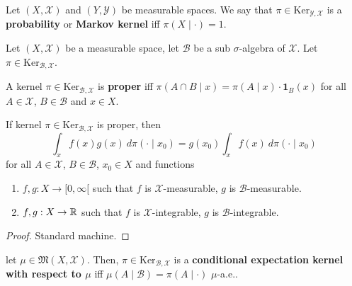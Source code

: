 \begin{definition}
    \label{def:markov-ker}
    \leanok

    Let $(X,\mathcal{X})$ and $(Y,\mathcal{Y})$ be measurable spaces. We say that $\pi\in\text{Ker}_{\mathcal{Y},\mathcal{X}}$ is a \textbf{probability} or \textbf{Markov kernel} iff $\pi(X\mid \cdot)=1$.
\end{definition}

Let $(X, \mathcal X)$ be a measurable space, let $\mathcal B$ be a sub $\sigma$-algebra of $\mathcal X$. Let $\pi \in \text{Ker}_{\mathcal B, \mathcal X}$.

\begin{definition}
    \label{def:proper-kernel}
    \leanok

    A kernel $\pi\in\text{Ker}_{\mathcal{B},\mathcal{X}}$ is \textbf{proper} iff $\pi(A\cap B\mid x)=\pi(A\mid x)\cdot\mathbf{1}_B(x)$ for all $A\in\mathcal{X}$, $B\in\mathcal{B}$ and $x\in X$.
\end{definition}

\begin{lemma}
    \label{lem:proper-kernel-integral}
    \leanok

    If kernel $\pi\in\text{Ker}_{\mathcal{B},\mathcal{X}}$ is proper, then
    $$\int_x f(x) g(x)\ d\pi(\cdot\mid x_0) = g(x_0)\int_x f(x)\ d\pi(\cdot\mid x_0)$$
    for all $A \in \mathcal X$, $B \in \mathcal B$, $x_0 \in X$ and functions
    \begin{enumerate}
        \item $f, g : X \to [0, \infty[$ such that $f$ is $\mathcal X$-measurable, $g$ is $\mathcal B$-measurable.
        \item $f, g : X \to \mathbb R$ such that $f$ is $\mathcal X$-integrable, $g$ is $\mathcal B$-integrable.
    \end{enumerate}
\end{lemma}
\begin{proof}

    Standard machine.
\end{proof}

\begin{definition}
    \label{def:cond-exp-ker}
    \leanok

    let $\mu\in\mathfrak{M}(X,\mathcal{X})$. Then, $\pi\in\text{Ker}_{\mathcal{B},\mathcal{X}}$ is a \textbf{conditional expectation kernel with respect to $\mu$} iff $\mu(A\mid \mathcal{B})=\pi(A\mid\cdot)$ $\mu$-a.e..
\end{definition}

